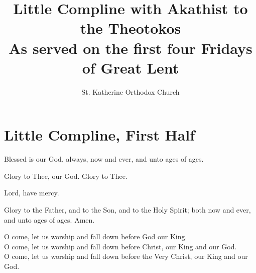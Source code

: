 \documentclass[twoside, letterpaper, 12pt]{report}
\title{Little Compline with Akathist to the Theotokos\\
       As served on the first four Fridays of Great Lent}
\author{St. Katherine Orthodox Church}
\date{}%
\begin{document}
\maketitle
\pagestyle{empty} %


\cleardoublepage
\pagestyle{plain}
\setcounter{page}{1}

\chapter*{Little Compline, First Half}
\begin{priest}
\item Blessed is our God, always, now and ever, and unto ages of ages.
\end{priest}


\begin{priest}
\item Glory to Thee, our God. Glory to Thee.
\item 
\end{priest}

\trisagionNeedsAmen{}


\begin{reader}
\item Lord, have mercy. \twelve
\item Glory to the Father, and to the Son, and to the Holy Spirit;
  both now and ever, 
  and unto ages of ages. Amen.

\item O come, let us worship and fall down before God our King.\\
  O come, let us worship and fall down before Christ, our King and our God.\\
  O come, let us worship and fall down before the Very Christ, our King and our God.
\end{reader}
\end{document}

